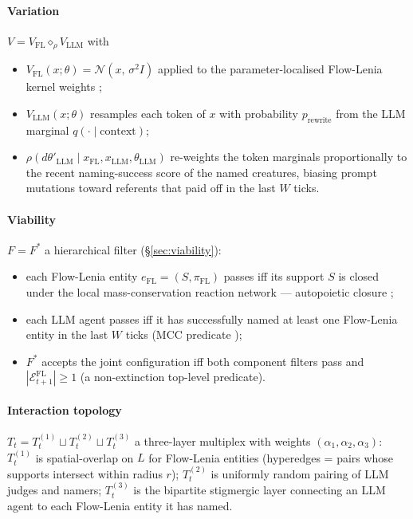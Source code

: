 \documentclass[journal]{IEEEtran}
\theoremstyle{plain}
\theoremstyle{definition}
\theoremstyle{plain}
\begin{document}
\paragraph{Variation}
$V = V_{\mathrm{FL}} \diamond_{\rho} V_{\mathrm{LLM}}$ with
\begin{itemize}[leftmargin=1.5em,itemsep=2pt]
  \item $V_{\mathrm{FL}}(x;\theta) = \mathcal{N}(x,\, \sigma^{2} I)$
        applied to the parameter-localised Flow-Lenia kernel weights
        \cite{plantec2025flowlenia};
  \item $V_{\mathrm{LLM}}(x;\theta)$ resamples each token of $x$ with
        probability $p_{\mathrm{rewrite}}$ from the LLM marginal
        $q(\cdot \mid \mathrm{context})$;
  \item $\rho(d\theta'_{\mathrm{LLM}} \mid x_{\mathrm{FL}},
              x_{\mathrm{LLM}}, \theta_{\mathrm{LLM}})$ re-weights the
        token marginals proportionally to the recent naming-success score
        of the named creatures, biasing prompt mutations toward referents
        that paid off in the last $W$ ticks.
\end{itemize}

\paragraph{Viability}
$F = F^{*}$ a hierarchical filter (\S\ref{sec:viability}):
\begin{itemize}[leftmargin=1.5em,itemsep=2pt]
  \item each Flow-Lenia entity $e_{\mathrm{FL}} = (S,\pi_{\mathrm{FL}})$
        passes iff its support $S$ is closed under the local
        mass-conservation reaction network --- autopoietic closure
        \cite{beer2014glider};
  \item each LLM agent passes iff it has successfully named at least one
        Flow-Lenia entity in the last $W$ ticks (MCC predicate
        \cite{brant2017mcc});
  \item $F^{*}$ accepts the joint configuration iff both component filters
        pass and $|\mathcal{E}_{t+1}^{\mathrm{FL}}| \geq 1$ (a non-extinction
        top-level predicate).
\end{itemize}

\paragraph{Interaction topology}
$T_{t} = T_{t}^{(1)} \sqcup T_{t}^{(2)} \sqcup T_{t}^{(3)}$ a three-layer
multiplex with weights $(\alpha_{1},\alpha_{2},\alpha_{3})$:
$T_{t}^{(1)}$ is spatial-overlap on $L$ for Flow-Lenia entities
(hyperedges = pairs whose supports intersect within radius $r$);
$T_{t}^{(2)}$ is uniformly random pairing of LLM judges and namers;
$T_{t}^{(3)}$ is the bipartite stigmergic layer connecting an LLM agent to
each Flow-Lenia entity it has named.
\end{document}

